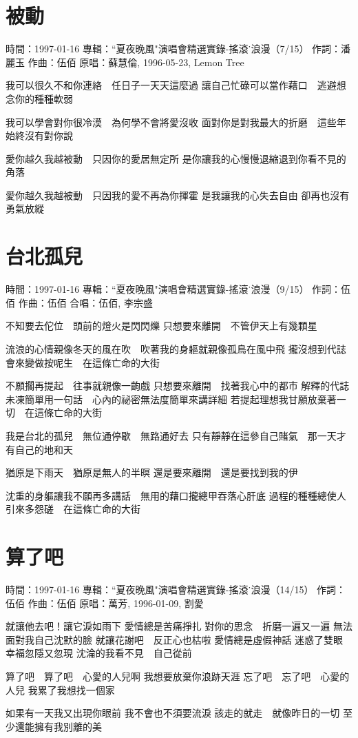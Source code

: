 \documentclass[UTF8,a4paper,oneside,twocolumn,12pt]{ctexbook}
\newcommand{\infopair}[2]{\textbullet #1：#2}
\newcommand{\zc}[1][伍佰]{\infopair{作詞}{#1}}
\newcommand{\zq}[1][伍佰]{\infopair{作曲}{#1}}
\newcommand{\zj}[1]{\infopair{專輯}{#1}}
\newcommand{\yc}[1]{\infopair{原唱}{#1}}
\newcommand{\sj}[1]{\infopair{時間}{#1}}
\newenvironment{info}{\begin{flushleft}\kaishu
	}
	{\end{flushleft}\normalsize\yahei\par}
\newenvironment{lyric}{
	}
{}
\begin{document}
\section{被動}
\begin{info}
	\sj{1997-01-16}
	\zj{``夏夜晚風"演唱會精選實錄-搖滾˙浪漫（7/15）}
	\zc[潘麗玉]
	\zq
	\yc{蘇慧倫, 1996-05-23, Lemon Tree}
\end{info}
\begin{lyric}
	我可以很久不和你連絡　任日子一天天這麼過
	讓自己忙碌可以當作藉口　逃避想念你的種種軟弱

	我可以學會對你很冷漠　為何學不會將愛沒收
	面對你是對我最大的折磨　這些年始終沒有對你說

	愛你越久我越被動　只因你的愛居無定所
	是你讓我的心慢慢退縮退到你看不見的角落

	愛你越久我越被動　只因我的愛不再為你揮霍
	是我讓我的心失去自由  卻再也沒有勇氣放縱
\end{lyric}

\section{台北孤兒}
\begin{info}
	\sj{1997-01-16}
	\zj{``夏夜晚風"演唱會精選實錄-搖滾˙浪漫（9/15）}
	\zc
	\zq
	\infopair{合唱}{伍佰, 李宗盛}
\end{info}
\begin{lyric}
	不知要去佗位　頭前的燈火是閃閃爍
	只想要來離開　不管伊天上有幾顆星

	流浪的心情親像冬天的風在吹　吹著我的身軀就親像孤鳥在風中飛
	攏沒想到代誌會來變做按呢生　在這條亡命的大街

	不願擱再提起　往事就親像一齣戲
	只想要來離開　找著我心中的都市
	解釋的代誌未凍簡單用一句話　心內的祕密無法度簡單來講詳細
	若提起理想我甘願放棄著一切　在這條亡命的大街

	我是台北的孤兒　無位通停歇　無路通好去
	只有靜靜在這參自己賭氣　那一天才有自己的地和天

	猶原是下雨天　猶原是無人的半暝
	還是要來離開　還是要找到我的伊

	沈重的身軀讓我不願再多講話　無用的藉口攏總甲吞落心肝底
	過程的種種總使人引來多怨磋　在這條亡命的大街
\end{lyric}

\section{算了吧}
\begin{info}
	\sj{1997-01-16}
	\zj{``夏夜晚風"演唱會精選實錄-搖滾˙浪漫（14/15）}
	\zc
	\zq
	\yc{萬芳, 1996-01-09, 割愛}
\end{info}
\begin{lyric}
	就讓他去吧！讓它淚如雨下
	愛情總是苦痛掙扎
	對你的思念　折磨一遍又一遍
	無法面對我自己沈默的臉
	就讓花謝吧　反正心也枯啦
	愛情總是虛假神話
	迷惑了雙眼　幸福忽隱又忽現
	沈淪的我看不見　自己從前

	算了吧　算了吧　心愛的人兒啊
	我想要放棄你浪跡天涯
	忘了吧　忘了吧　心愛的人兒
	我累了我想找一個家

	如果有一天我又出現你眼前
	我不會也不須要流淚
	該走的就走　就像昨日的一切
	至少還能擁有我別離的美
\end{lyric}
\end{document}
